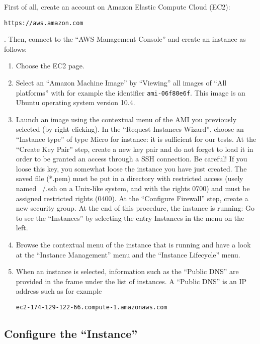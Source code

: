 First of all, create an account on Amazon Elastic Compute Cloud
(EC2): \begin{small}\texttt{https://\-aws.\-amazon.\-com}\end{small}. Then,
connect to the ``AWS Management Console'' and create an instance as follows:
\begin{enumerate}
\item Choose the \textsf{EC2} page.
\item Select an ``Amazon Machine Image'' by ``Viewing'' all images of
  ``All platforms'' with for example the identifier
  \texttt{ami-06f80e6f}. This image is an Ubuntu operating system
  version \textsf{10.4}.
\item Launch an image using the contextual menu of the AMI you
  previously selected (by right clicking). In the ``Request Instances
  Wizard'', choose an ``Instance type'' of type \textsf{Micro} for
  instance: it is sufficient for our tests. At the ``Create Key Pair''
  step, create a new key pair and do not forget to load it in order to
  be granted an access through a SSH connection. Be careful! If you
  loose this key, you somewhat loose the instance you have just
  created.  The saved file (\textsf{*.pem}) must be put in a directory
  with restricted access (usely named \textsf{\string~/.ssh} on a
  Unix-like system, and with the rights \textsf{0700}) and must be
  assigned restricted rights (\textsf{0400}). At the ``Configure
  Firewall'' step, create a new security group. At the end of this
  procedure, the instance is running: Go to see the ``Instances'' by
  selecting the entry \textsf{Instances} in the menu on the left.
\item Browse the contextual menu of the instance that is running and
  have a look at the ``Instance Management'' menu and the ``Instance
  Lifecycle'' menu.
\item When an instance is selected, information such as the ``Public
  DNS'' are provided in the frame under the list of instances. A
  ``Public DNS'' is an IP address such as for
  example \begin{small}\texttt{ec2-174-129-122-66.compute-1.amazonaws.com}\end{small}
\end{enumerate}

\subsection{Configure the ``Instance''}
\label{SS_ec2_configure_instance}

